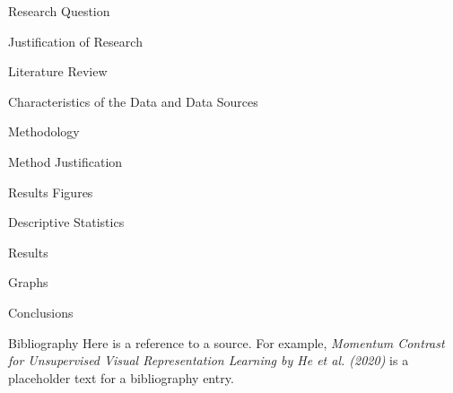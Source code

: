 \documentclass[12pt]{beamer}
\begin{document}
\begin{frame}[allowframebreaks]{Research Question}

\end{frame}

\begin{frame}[allowframebreaks]{Justification of Research}

\end{frame}

\begin{frame}[allowframebreaks]{Literature Review}

\end{frame}

\begin{frame}[allowframebreaks]{Characteristics of the Data and Data Sources}

\end{frame}

\begin{frame}[allowframebreaks]{Methodology}

\end{frame}

\begin{frame}[allowframebreaks]{Method Justification}

\end{frame}

\begin{frame}[allowframebreaks]{Results Figures}

\end{frame}

\begin{frame}[allowframebreaks]{Descriptive Statistics}

\end{frame}

\begin{frame}[allowframebreaks]{Results}

\end{frame}

\begin{frame}[allowframebreaks]{Graphs}

\end{frame}

\begin{frame}[allowframebreaks]{Conclusions}

\end{frame}
\begin{frame}[allowframebreaks]{Bibliography}
	Here is a reference to a source. For example, \textit{Momentum Contrast for Unsupervised Visual Representation Learning by He et al. (2020)} \cite{he2020momentum} is a placeholder text for a bibliography entry.

	\framebreak

	\scriptsize
	\printbibliography
\end{frame}
\end{document}
